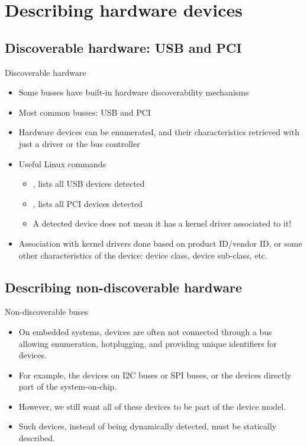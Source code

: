 \section[HW-Devices]{Describing hardware devices}

\subsection{Discoverable hardware: USB and PCI}

\begin{frame}{Discoverable hardware}
  \begin{itemize}
  \item Some busses have built-in hardware discoverability mechanisms
  \item Most common busses: USB and PCI
  \item Hardware devices can be enumerated, and their characteristics
    retrieved with just a driver or the bus controller
  \item Useful Linux commands
    \begin{itemize}
    \item {}, lists all USB devices detected
    \item {}, lists all PCI devices detected
    \item A detected device does not mean it has a kernel driver
      associated to it!
    \end{itemize}
  \item Association with kernel drivers done based on product
    ID/vendor ID, or some other characteristics of the device: device
    class, device sub-class, etc.
  \end{itemize}
\end{frame}

\subsection{Describing non-discoverable hardware}

\begin{frame}{Non-discoverable buses}
  \begin{itemize}
  \item On embedded systems, devices are often not connected through a
    bus allowing enumeration, hotplugging, and providing unique
    identifiers for devices.
  \item For example, the devices on I2C buses or SPI buses, or the
    devices directly part of the system-on-chip.
  \item However, we still want all of these devices to be part of the
    device model.
  \item Such devices, instead of being dynamically detected, must be
    statically described.
  \end{itemize}
\end{frame}

